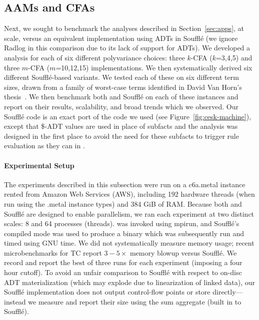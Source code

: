 \subsection{AAMs and CFAs}
\label{sec:eval:aam}
\label{sec:eval:pb2}



Next, we sought to benchmark the analyses described in
Section~\ref{sec:apps}, at scale, versus an equivalent
implementation using ADTs in Souffl\'e (we ignore Radlog in this
comparison due to its lack of support for ADTs). We developed a
\slog{} analysis for each of six different polyvariance choices: three
$k$-CFA ($k$=3,4,5) and three $m$-CFA ($m$=10,12,15)
implementations. We then systematically derived six different
Souffl\'e-based variants. We tested each of these on six different
term sizes, drawn from a family of worst-case terms identified in
David Van Horn's thesis~\cite{VanHorn:diss}. We then benchmark both \slog{} and Souffl\'e on each of these instances and report on their results,
scalability, and broad trends which we observed. Our
Souffl\'e code is an exact port of the \slog{} code we used (see Figure~\ref{fig:cesk-machine}), except
that \$-ADT values are used in place of subfacts and the analysis was
designed in the first place to avoid the need for these subfacts to
trigger rule evaluation as they can in \slog{}.

\paragraph*{Experimental Setup}

The experiments described in this subsection were run on a
\textsf{c6a.metal} instance rented from Amazon Web Services (AWS),
including 192 hardware threads (when run using the \textsf{.metal}
instance types) and 384 GiB of RAM. Because both \slog{} and Souffl\'e
are designed to enable parallelism, we ran each experiment at two
distinct scales: 8 and 64 processes (threads). \slog{} was invoked
using \textsf{mpirun}, and Souffl\'e's compiled mode was used to
produce a binary which was subsequently run and timed using GNU
\textsf{time}. We did not systematically measure memory usage; recent
microbenchmarks for TC report $3-5\times$ memory blowup versus Souffl\'e. We
record and report the best of three runs for each experiment (imposing
a four hour cutoff). To avoid an unfair comparison to Souffl\'e with
respect to on-disc ADT materialization (which may explode due to
linearization of linked data), our Souffl\'e implementation does not
output control-flow points or store directly---instead we measure and
report their size using the \textsf{sum} aggregate (built in to
Souffl\'e).

